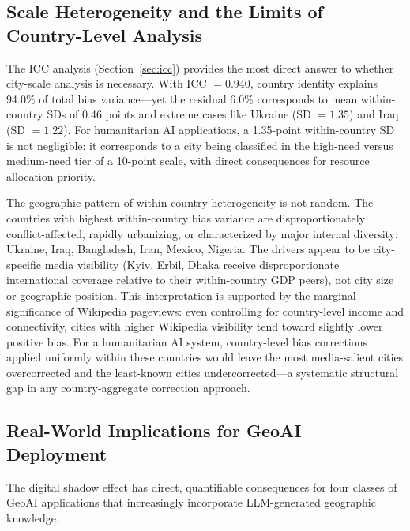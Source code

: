 \documentclass[12pt]{article}
\begin{document}
\subsection{Scale Heterogeneity and the Limits of Country-Level Analysis}

The ICC analysis (Section~\ref{sec:icc}) provides the most direct answer to whether city-scale analysis is necessary. With ICC $= 0.940$, country identity explains 94.0\% of total bias variance---yet the residual 6.0\% corresponds to mean within-country SDs of 0.46 points and extreme cases like Ukraine (SD $= 1.35$) and Iraq (SD $= 1.22$). For humanitarian AI applications, a 1.35-point within-country SD is not negligible: it corresponds to a city being classified in the high-need versus medium-need tier of a 10-point scale, with direct consequences for resource allocation priority.

The geographic pattern of within-country heterogeneity is not random. The countries with highest within-country bias variance are disproportionately conflict-affected, rapidly urbanizing, or characterized by major internal diversity: Ukraine, Iraq, Bangladesh, Iran, Mexico, Nigeria. The drivers appear to be city-specific media visibility (Kyiv, Erbil, Dhaka receive disproportionate international coverage relative to their within-country GDP peers), not city size or geographic position. This interpretation is supported by the marginal significance of Wikipedia pageviews: even controlling for country-level income and connectivity, cities with higher Wikipedia visibility tend toward slightly lower positive bias. For a humanitarian AI system, country-level bias corrections applied uniformly within these countries would leave the most media-salient cities overcorrected and the least-known cities undercorrected---a systematic structural gap in any country-aggregate correction approach.

\subsection{Real-World Implications for GeoAI Deployment}
\label{sec:realworld}

The digital shadow effect has direct, quantifiable consequences for four classes of GeoAI applications that increasingly incorporate LLM-generated geographic knowledge.
\end{document}
